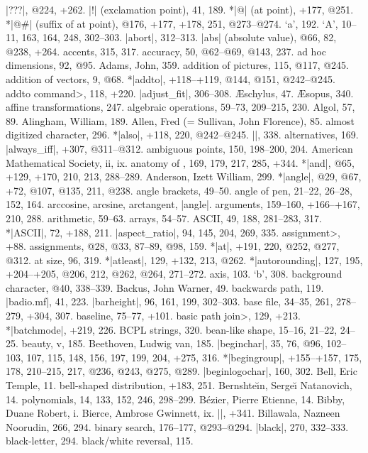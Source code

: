 |???|, @224, +262.
|!| (exclamation point), 41, 189.
*|@| (at point), +177, @251.
*|@#| (suffix of at point), @176, +177, +178, 251, @273--@274.
\newletter
`a', 192.
`A', 10--11, 163, 164, 248, 302--303.
|abort|, 312--313.
|abs| (absolute value), @66, 82, @238, +264.
accents, 315, 317.
accuracy, 50, @62--@69, @143, 237.
ad hoc dimensions, 92, @95.
Adams, John, 359.
addition of pictures, 115, @117, @245.
addition of vectors, 9, @68.
*|addto|, +118--+119, @144, @151, @242--@245.
\<addto command>, 118, +220.
|adjust_fit|, 306--308.
{\AE}schylus, 47.
{\AE}sopus, 340.
affine transformations, 247.
algebraic operations, 59--73, 209--215, 230.
Algol, 57, 89.
Alingham, William, 189.
Allen, Fred (= Sullivan, John Florence), 85.
almost digitized character, 296.
*|also|, +118, 220, @242--@245.
|\alternation|, 338.
alternatives, 169.
|always_iff|, +307, @311--@312.
ambiguous points, 150, 198--200, 204.
American Mathematical Society, ii, ix.
anatomy of \MF, 169, 179, 217, 285, +344.
*|and|, @65, +129, +170, 210, 213, 288--289.
Anderson, Izett William, 299.
*|angle|, @29, @67, +72, @107, @135, 211, @238.
angle brackets, 49--50.
angle of pen, 21--22, 26--28, 152, 164.
arccosine, arcsine, arctangent, \see |angle|.
arguments, 159--160, +166--+167, 210, 288.
arithmetic, 59--63.
arrays, 54--57.
ASCII, 49, 188, 281--283, 317.
*|ASCII|, 72, +188, 211.
|aspect_ratio|, 94, 145, 204, 269, 335.
\<assignment>, +88.
assignments, @28, @33, 87--89, @98, 159.
*|at|, +191, 220, @252, @277, @312.
at size, 96, 319.
*|atleast|, 129, +132, 213, @262.
*|autorounding|, 127, 195, +204--+205, @206, 212, @262, @264, 271--272.
axis, 103.
\newletter
`b', 308.
background character, @40, 338--339.
Backus, John Warner, 49.
backwards path, 119.
|badio.mf|, 41, 223.
|barheight|, 96, 161, 199, 302--303.
base file, 34--35, 261, 278--279, +304, 307.
baseline, 75--77, +101.
\<basic path join>, 129, +213.
*|batchmode|, +219, 226.
BCPL strings, 320.
bean-like shape, 15--16, 21--22, 24--25.
beauty, v, 185.
Beethoven, Ludwig van, 185.
|beginchar|, 35, 76, @96, 102--103, 107, 115, 148, 156, 197, 199, 204,
 +275, 316.
*|begingroup|, +155--+157, 175, 178, 210--215, 217, @236, @243, @275, @289.
|beginlogochar|, 160, 302.
Bell, Eric Temple, 11.
bell-shaped distribution, +183, 251.
Bernshte{\u\i}n, Serge{\u\i} \thinspace Natanovich, 14.
\sub polynomials, 14, 133, 152, 246, 298--299.
B\'ezier, Pierre Etienne, 14.
Bibby, Duane Robert, i.
Bierce, Ambrose Gwinnett, ix.
|\bigtest|, +341.
Billawala, Nazneen Noorudin, 266, 294.
binary search, 176--177, @293--@294.
|black|, 270, 332--333.
black-letter, 294.
black/white reversal, 115.
